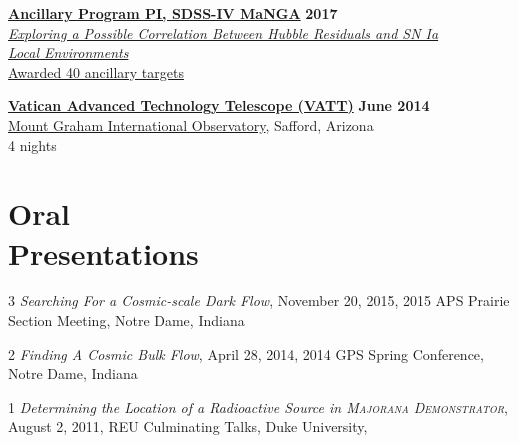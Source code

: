 \documentclass[margin]{res}
\begin{document}
\begin{resume}
{\href{http://www.sdss.org/dr13/manga/}{\bf Ancillary Program PI, SDSS-IV MaNGA}} \hfill \textbf{2017} \\
\href{https://trac.sdss.org/wiki/MANGA/Survey/AncillaryPrograms2017/Rose_SNIa_Environments_and_HR}{\textit{Exploring a Possible Correlation Between Hubble Residuals and SN Ia \\Local Environments}}\\
\href{http://www.sdss.org/dr14/manga/manga-target-selection/ancillary-targets/}{Awarded 40 ancillary targets}

{\href{http://vaticanobservatory.org/VATT/}{\bf  Vatican Advanced Technology Telescope (VATT)}} \hfill \textbf{June 2014} \\
\href{http://mgio.arizona.edu}{Mount Graham International Observatory}, Safford, Arizona \\
4 nights










\section{Oral \\Presentations}

\hangindent=15pt {\footnotesize \textcolor{light-gray}{3}} {\sl Searching For a Cosmic-scale Dark Flow}, November 20, 2015,
2015 APS Prairie Section Meeting, Notre Dame, Indiana
\vspace{-12pt}

\hangindent=15pt {\footnotesize \textcolor{light-gray}{2}} {\sl Finding A Cosmic Bulk Flow}, April 28, 2014, 2014 GPS Spring Conference, Notre Dame, Indiana
\vspace{-12pt}

\hangindent=15pt {\footnotesize \textcolor{light-gray}{1}} {\sl Determining the Location of a Radioactive Source in \textsc{Majorana Demonstrator}}, August 2, 2011, REU Culminating Talks, Duke University, 

\begin{comment}
{\sl Searching For a Cosmic-scale Dark Flow} \hfill {\bf November 20, 2015}\\
2015 APS Prairie Section Meeting, Notre Dame


\end{comment}
\end{resume}
\end{document}
